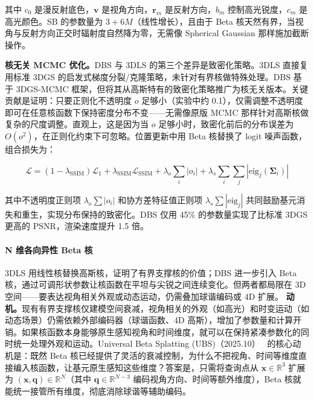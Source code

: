 其中 $c_0$ 是漫反射底色，$\mathbf{v}$ 是视角方向，$\mathbf{r}_m$ 是反射方向，$b_m$ 控制高光锐度，$c_m$ 是高光颜色。SB 的参数量为 $3 + 6M$（线性增长），且由于 Beta 核天然有界，当视角与反射方向正交时辐射度自然降为零，无需像 Spherical Gaussian 那样施加截断操作。

\textbf{核无关 MCMC 优化。}DBS 与 3DLS 的第三个差异是致密化策略。3DLS 直接复用标准 3DGS 的启发式梯度分裂/克隆策略，未针对有界核做特殊处理。DBS 基于 3DGS-MCMC 框架，但将其从高斯特有的致密化策略推广为核无关版本。关键贡献是证明：只要正则化不透明度 $o$ 足够小（实验中约 0.1），仅需调整不透明度即可在任意核函数下保持密度分布不变——无需像原版 MCMC 那样针对高斯核做复杂的尺度调整。直观上，这是因为当 $o$ 足够小时，致密化前后的分布误差为 $O(o^2)$，在正则化约束下可忽略。位置更新中用 Beta 核替换了 logit 噪声函数，组合损失为：

\begin{equation}
\mathcal{L} = (1 - \lambda_{\text{SSIM}}) \mathcal{L}_1 + \lambda_{\text{SSIM}} \mathcal{L}_{\text{SSIM}} + \lambda_o \sum_i |o_i| + \lambda_s \sum_i \sum_j |\text{eig}_j(\boldsymbol{\Sigma}_i)|
\end{equation}

其中不透明度正则项 $\lambda_o \sum |o_i|$ 和协方差特征值正则项 $\lambda_s \sum |\text{eig}_j|$ 共同鼓励基元消失和重生，实现分布保持的致密化。DBS 仅用 45\% 的参数量实现了比标准 3DGS 更高的 PSNR，渲染速度提升 1.5 倍。

\paragraph{N 维各向异性 Beta 核}

3DLS 用线性核替换高斯核，证明了有界支撑核的价值；DBS 进一步引入 Beta 核，通过可调形状参数让核函数在平坦与尖锐之间连续变化。但两者都局限在 3D 空间——要表达视角相关外观或动态运动，仍需叠加球谐编码或 4D 扩展。
\textbf{动机。}现有有界支撑核仅建模空间衰减，视角相关的外观（如高光）和时变运动（如动态场景）仍需依赖外部编码器（球谐函数、4D 高斯），增加了参数量和计算开销。如果核函数本身能够原生感知视角和时间维度，就可以在保持紧凑参数化的同时统一处理外观和运动。Universal Beta Splatting (UBS)（2025.10）~\cite{2510_03312} 的核心动机是：既然 Beta 核已经提供了灵活的衰减控制，为什么不把视角、时间等维度直接编入核函数，让基元原生感知这些维度？答案是，只需将查询点从 $\mathbf{x} \in \mathbb{R}^3$ 扩展为 $(\mathbf{x}, \mathbf{q}) \in \mathbb{R}^N$（其中 $\mathbf{q} \in \mathbb{R}^{N-3}$ 编码视角方向、时间等额外维度），Beta 核就能统一接管所有维度，彻底消除球谐等辅助编码。

